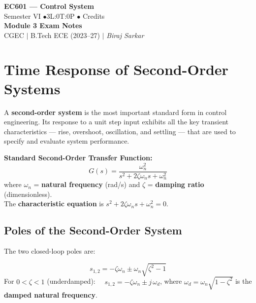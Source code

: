 \documentclass[12pt,a4paper]{article}
\begin{document}

\begin{center}
  {\LARGE\bfseries\color{myred} EC601 — Control System}\\[5pt]
  {\normalsize\color{mydark} Semester VI \quad$\bullet$\quad 3L:0T:0P \quad$\bullet$ Credits}\\[3pt]
  {\normalsize\color{myteal}\textbf{Module 3 Exam Notes}}\\[3pt]
  {\small\color{mydark} CGEC \;$|$\; B.Tech ECE (2023--27) \;$|$\; \textit{Biraj Sarkar}}
\end{center}
\vspace{2pt}
\noindent{\color{myred}\rule{\linewidth}{1.5pt}}
\vspace{2pt}

\hypersetup{linkcolor=mydark}
\tableofcontents
\hypersetup{linkcolor=myteal}
\newpage

\section{Time Response of Second-Order Systems}

A \textbf{second-order system} is the most important standard form in control engineering. Its response to a unit step input exhibits all the key transient characteristics — rise, overshoot, oscillation, and settling — that are used to specify and evaluate system performance.

\begin{tcolorbox}[defbox]
\textbf{Standard Second-Order Transfer Function:}
$$G(s) = \frac{\omega_n^2}{s^2 + 2\zeta\omega_n s + \omega_n^2}$$
where $\omega_n$ = \textbf{natural frequency} (rad/s) and $\zeta$ = \textbf{damping ratio} (dimensionless).\\
The \textbf{characteristic equation} is $s^2 + 2\zeta\omega_n s + \omega_n^2 = 0$.
\end{tcolorbox}

\subsection{Poles of the Second-Order System}

The two closed-loop poles are:
\begin{tcolorbox}[formulabox]
$$s_{1,2} = -\zeta\omega_n \pm \omega_n\sqrt{\zeta^2 - 1}$$
For $0 < \zeta < 1$ (underdamped): $\quad s_{1,2} = -\zeta\omega_n \pm j\,\omega_d$, \quad where $\omega_d = \omega_n\sqrt{1-\zeta^2}$ is the \textbf{damped natural frequency}.
\end{tcolorbox}
\end{document}
